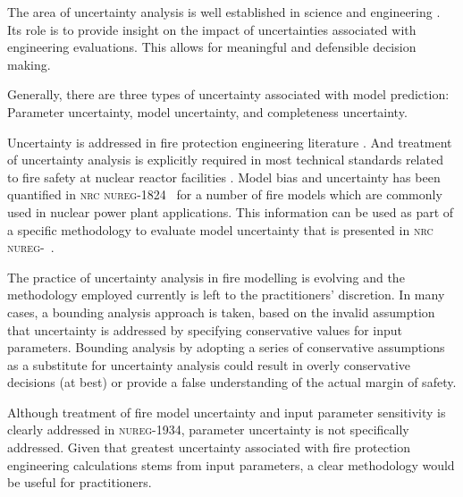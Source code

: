 

The area of uncertainty analysis is well established in science and engineering \cite{Morgan}. 
Its role is to provide insight on the impact of uncertainties associated with engineering evaluations. This allows for meaningful and defensible decision making.

Generally, there are three types of uncertainty associated with model prediction: Parameter uncertainty, model uncertainty, and completeness uncertainty. 


Uncertainty is addressed in fire protection engineering literature \cite{Notarianni:SFPE}. 
And treatment of uncertainty analysis is explicitly required in most technical standards related to fire safety at nuclear reactor facilities \cite{NFPA:805, NUREG:6850}. 
Model bias and uncertainty has been quantified in \textsc{nrc nureg-1824}~\cite{NUREG_1824_Sup_1} for a number of fire models which are commonly used in nuclear power plant applications. This information can be used as part of a specific methodology to evaluate model uncertainty  that is presented in \textsc{nrc nureg}-~\cite{NUREG_1934}. 


The practice of uncertainty analysis in fire modelling is evolving and the methodology employed currently is left to the practitioners' discretion. In many cases, a bounding analysis approach is taken, based on the invalid assumption that uncertainty is addressed by specifying conservative values for input parameters. Bounding analysis by adopting a series of conservative assumptions as a substitute for uncertainty analysis could result in overly conservative decisions (at best) or provide a false understanding of the actual margin of safety.

Although treatment of fire model uncertainty and input parameter sensitivity is clearly addressed in \textsc{nureg}-1934, parameter uncertainty is not specifically addressed. Given that greatest uncertainty associated with fire protection engineering calculations stems from input parameters, a clear methodology would be useful for practitioners.

